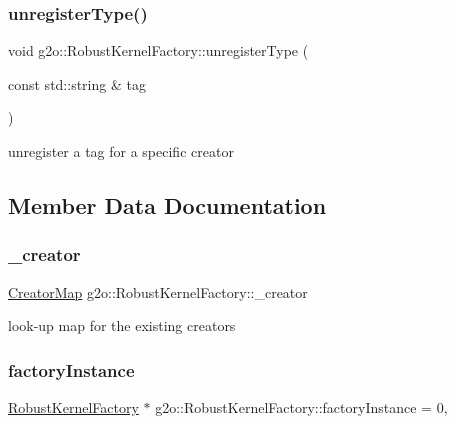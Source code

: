 \subsubsection{\texorpdfstring{unregister\+Type()}{unregisterType()}}
{\footnotesize\ttfamily void g2o\+::\+Robust\+Kernel\+Factory\+::unregister\+Type (\begin{DoxyParamCaption}\item[{const std\+::string \&}]{tag }\end{DoxyParamCaption})}

unregister a tag for a specific creator 

\subsection{Member Data Documentation}
\mbox{\label{classg2o_1_1_robust_kernel_factory_af5f3cea409d3f18baa40da898d21424b}} 
\subsubsection{\texorpdfstring{\+\_\+creator}{\_creator}}
{\footnotesize\ttfamily \mbox{\hyperlink{classg2o_1_1_robust_kernel_factory_aa143765542cbf4738e2137d61517b218}{Creator\+Map}} g2o\+::\+Robust\+Kernel\+Factory\+::\+\_\+creator\hspace{0.3cm}{\ttfamily [protected]}}



look-\/up map for the existing creators 

\mbox{\label{classg2o_1_1_robust_kernel_factory_a598761493f11f50bee72b4799fab050e}} 
\subsubsection{\texorpdfstring{factory\+Instance}{factoryInstance}}
{\footnotesize\ttfamily \mbox{\hyperlink{classg2o_1_1_robust_kernel_factory}{Robust\+Kernel\+Factory}} $\ast$ g2o\+::\+Robust\+Kernel\+Factory\+::factory\+Instance = 0\hspace{0.3cm}{\ttfamily [static]}, {\ttfamily [private]}}



